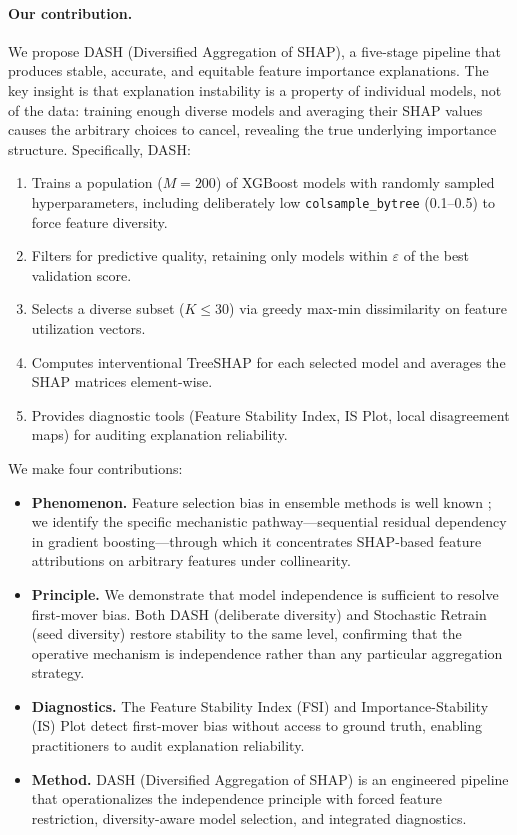 \documentclass[11pt]{article}
\newcommand{\dash}{\textsc{DASH}}
\begin{document}
\paragraph{Our contribution.}
We propose \dash{} (Diversified Aggregation of SHAP), a five-stage
pipeline that produces stable, accurate, and equitable feature importance
explanations. The key insight is that explanation instability is a property
of individual models, not of the data: training enough diverse models and
averaging their SHAP values causes the arbitrary choices to cancel,
revealing the true underlying importance structure. Specifically, \dash{}:

\begin{enumerate}
  \item Trains a population ($M = 200$) of XGBoost models with
    randomly sampled hyperparameters, including deliberately low
    \texttt{colsample\_bytree} (0.1--0.5) to force feature diversity.
  \item Filters for predictive quality, retaining only models within
    $\varepsilon$ of the best validation score.
  \item Selects a diverse subset ($K \leq 30$) via greedy max-min
    dissimilarity on feature utilization vectors.
  \item Computes interventional TreeSHAP for each selected model and
    averages the SHAP matrices element-wise.
  \item Provides diagnostic tools (Feature Stability Index, IS Plot,
    local disagreement maps) for auditing explanation reliability.
\end{enumerate}

We make four contributions:
\begin{itemize}
  \item \textbf{Phenomenon.} Feature selection bias in ensemble methods
    is well known \citep{strobl2007bias, hooker2019please}; we identify
    the specific mechanistic pathway---sequential residual dependency
    in gradient boosting---through which it concentrates SHAP-based
    feature attributions on arbitrary features under collinearity.
  \item \textbf{Principle.} We demonstrate that model independence is
    sufficient to resolve first-mover bias.
    Both \dash{} (deliberate diversity) and Stochastic Retrain (seed
    diversity) restore stability to the same level, confirming that
    the operative mechanism is independence rather than any particular
    aggregation strategy.
  \item \textbf{Diagnostics.} The Feature Stability Index (FSI) and
    Importance-Stability (IS) Plot detect first-mover bias without
    access to ground truth, enabling practitioners to audit explanation
    reliability.
  \item \textbf{Method.} \dash{} (Diversified Aggregation of SHAP) is
    an engineered pipeline that operationalizes the independence principle
    with forced feature restriction, diversity-aware model selection,
    and integrated diagnostics.
\end{itemize}
\end{document}
